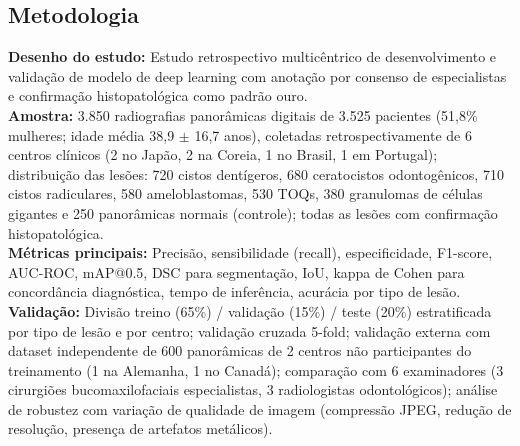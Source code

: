 \subsection{Metodologia}
\textbf{Desenho do estudo:} Estudo retrospectivo multicêntrico de
desenvolvimento e validação de modelo de deep learning com anotação
por consenso de especialistas e confirmação histopatológica como
padrão ouro. \\
\textbf{Amostra:} 3.850 radiografias panorâmicas digitais de 3.525
pacientes (51,8\% mulheres; idade média 38,9 $\pm$ 16,7 anos),
coletadas retrospectivamente de 6 centros clínicos (2 no Japão,
2 na Coreia, 1 no Brasil, 1 em Portugal); distribuição das lesões:
720 cistos dentígeros, 680 ceratocistos odontogênicos, 710 cistos
radiculares, 580 ameloblastomas, 530 TOQs, 380 granulomas de
células gigantes e 250 panorâmicas normais (controle); todas as
lesões com confirmação histopatológica. \\
\textbf{Métricas principais:} Precisão, sensibilidade (recall),
especificidade, F1-score, AUC-ROC, mAP@0.5, DSC para segmentação,
IoU, kappa de Cohen para concordância diagnóstica, tempo de
inferência, acurácia por tipo de lesão. \\
\textbf{Validação:} Divisão treino (65\%) / validação (15\%) / teste
(20\%) estratificada por tipo de lesão e por centro; validação
cruzada 5-fold; validação externa com dataset independente de 600
panorâmicas de 2 centros não participantes do treinamento (1 na
Alemanha, 1 no Canadá); comparação com 6 examinadores (3 cirurgiões
bucomaxilofaciais especialistas, 3 radiologistas odontológicos);
análise de robustez com variação de qualidade de imagem (compressão
JPEG, redução de resolução, presença de artefatos metálicos).

